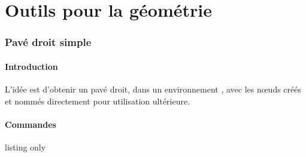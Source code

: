 \part{Outils pour la géométrie}

\section{Pavé droit \og simple \fg}\label{pave}

\subsection{Introduction}

\begin{tipblock}
L'idée est d'obtenir un pavé droit, dans un environnement \TikZ, avec les nœuds créés et nommés directement pour utilisation ultérieure.
\end{tipblock}

\subsection{Commandes}

\begin{PresCodeTexPL}{listing only}
\end{PresCodeTexPL}

